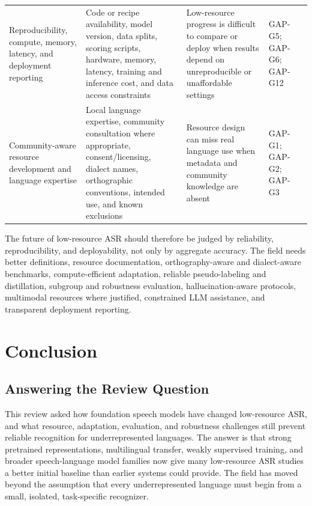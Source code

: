 \documentclass[pdflatex,sn-basic]{sn-jnl}
\theoremstyle{thmstyleone}
\theoremstyle{thmstyletwo}
\theoremstyle{thmstylethree}
\begin{document}
\begin{table}[htbp]
\begin{tabularx}{\textwidth}{YYYYY}
Reproducibility, compute, memory, latency, and deployment reporting & Code or recipe availability, model version, data splits, scoring scripts, hardware, memory, latency, training and inference cost, and data access constraints & Low-resource progress is difficult to compare or deploy when results depend on unreproducible or unaffordable settings & GAP-G5; GAP-G6; GAP-G12 & \citep{watanabe2018espnet,ravanelli2021speechbrain,povey2011kaldi,strubell2019_energy_policy} \\
Community-aware resource development and language expertise & Local language expertise, community consultation where appropriate, consent/licensing, dialect names, orthographic conventions, intended use, and known exclusions & Resource design can miss real language use when metadata and community knowledge are absent & GAP-G1; GAP-G2; GAP-G3 & \citep{ardila2020commonvoice,bender2018_data_statements,gebru2021_datasheets_for_datasets,mitchell2019_model_cards} \\
\bottomrule
\end{tabularx}
\end{table}

The future of low-resource ASR should therefore be judged by reliability, reproducibility, and deployability, not only by aggregate accuracy. The field needs better definitions, resource documentation, orthography-aware and dialect-aware benchmarks, compute-efficient adaptation, reliable pseudo-labeling and distillation, subgroup and robustness evaluation, hallucination-aware protocols, multimodal resources where justified, constrained LLM assistance, and transparent deployment reporting.

\section{Conclusion}

\subsection{Answering the Review Question}

This review asked how foundation speech models have changed low-resource ASR, and what resource, adaptation, evaluation, and robustness challenges still prevent reliable recognition for underrepresented languages. The answer is that strong pretrained representations, multilingual transfer, weakly supervised training, and broader speech-language model families now give many low-resource ASR studies a better initial baseline than earlier systems could provide. The field has moved beyond the assumption that every underrepresented language must begin from a small, isolated, task-specific recognizer.
\end{document}

